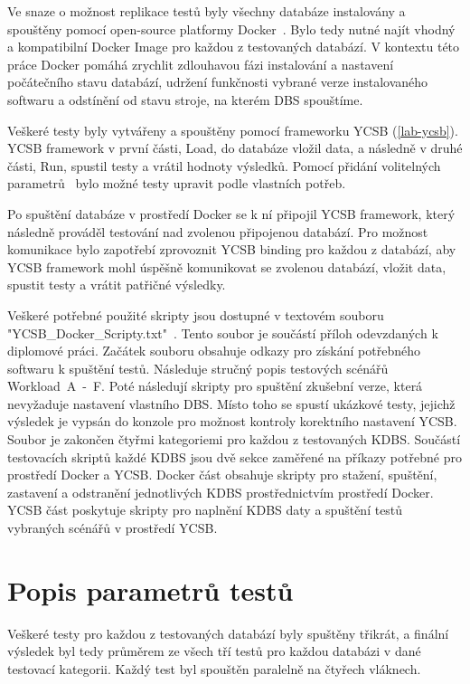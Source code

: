 \documentclass[czech,master,dept460,male,csharp,cpdeclaration]{diploma}
\begin{document}
	Ve snaze o možnost replikace testů byly všechny databáze instalovány a spouštěny pomocí open-source platformy Docker~\cite{docker}. Bylo tedy nutné najít vhodný a kompatibilní Docker Image pro každou z testovaných databází. V kontextu této práce Docker pomáhá zrychlit zdlouhavou fázi instalování a nastavení počátečního stavu databází, udržení funkčnosti vybrané verze instalovaného softwaru a odstínění od stavu stroje, na kterém DBS spouštíme.
	
	Veškeré testy byly vytvářeny a spouštěny pomocí frameworku YCSB (\ref{lab-ycsb}). YCSB framework v první části, Load, do databáze vložil data, a následně v druhé části, Run, spustil testy a vrátil hodnoty výsledků. Pomocí přidání volitelných parametrů~\cite{ycsb-properties} bylo možné testy upravit podle vlastních potřeb.
	
	Po spuštění databáze v prostředí Docker se k ní připojil YCSB framework, který následně prováděl testování nad zvolenou připojenou databází. Pro možnost komunikace bylo zapotřebí zprovoznit YCSB binding pro každou z databází, aby YCSB framework mohl úspěšně komunikovat se zvolenou databází, vložit data, spustit testy a vrátit patřičné výsledky.
	
	Veškeré potřebné použité skripty jsou dostupné v textovém souboru "YCSB\_Docker\_Scripty.txt"~\cite{skripty-soubor}. Tento soubor je součástí příloh odevzdaných k diplomové práci. Začátek souboru obsahuje odkazy pro získání potřebného softwaru k spuštění testů. Následuje stručný popis testových scénářů Workload~A~-~F. Poté následují skripty pro spuštění zkušební verze, která nevyžaduje nastavení vlastního DBS. Místo toho se spustí ukázkové testy, jejichž výsledek je vypsán do konzole pro možnost kontroly korektního nastavení YCSB. Soubor je zakončen čtyřmi kategoriemi pro každou z testovaných KDBS. Součástí testovacích skriptů každé KDBS jsou dvě sekce zaměřené na příkazy potřebné pro prostředí Docker a YCSB. Docker část obsahuje skripty pro stažení, spuštění, zastavení a odstranění jednotlivých KDBS prostřednictvím prostředí Docker. YCSB část poskytuje skripty pro naplnění KDBS daty a spuštění testů vybraných scénářů v prostředí YCSB.
	
	\section{Popis parametrů testů}\label{test-param}
	
	Veškeré testy pro každou z testovaných databází byly spuštěny třikrát, a finální výsledek byl tedy průměrem ze všech tří testů pro každou databázi v dané testovací kategorii. Každý test byl spouštěn paralelně na čtyřech vláknech.
	
\end{document}

